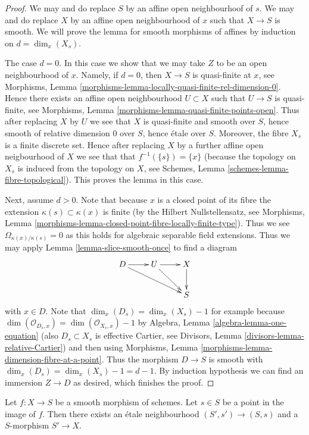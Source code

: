 \begin{proof}
We may and do replace $S$ by an affine open neighbourhoof of $s$.
We may and do replace $X$ by an affine open neighbourhood of $x$
such that $X \to S$ is smooth.
We will prove the lemma for smooth morphisms of affines
by induction on $d = \dim_x(X_s)$.

\medskip\noindent
The case $d = 0$. In this case we show that we may take $Z$ to be
an open neighbourhood of $x$. Namely, if $d = 0$, then $X \to S$
is quasi-finite at $x$, see
Morphisms, Lemma \ref{morphisms-lemma-locally-quasi-finite-rel-dimension-0}.
Hence there exists an affine open neighbourhood $U \subset X$ such
that $U \to S$ is quasi-finite, see
Morphisms, Lemma \ref{morphisms-lemma-quasi-finite-points-open}.
Thus after replacing $X$ by $U$ we see that
$X$ is quasi-finite and smooth over $S$, hence
smooth of relative dimension $0$ over $S$, hence
\'etale over $S$. Moreover, the fibre $X_s$ is a finite
discrete set. Hence after replacing $X$ by a further affine open neigbourhood
of $X$ we see that that $f^{-1}(\{s\}) = \{x\}$ (because the topology
on $X_s$ is induced from the topology on $X$, see
Schemes, Lemma \ref{schemes-lemma-fibre-topological}).
This proves the lemma in this case.

\medskip\noindent
Next, assume $d > 0$. Note that because $x$ is a closed point of its
fibre the extension $\kappa(s) \subset \kappa(x)$ is finite (by the
Hilbert Nullstellensatz, see
Morphisms, Lemma \ref{morphisms-lemma-closed-point-fibre-locally-finite-type}).
Thus we see $\Omega_{\kappa(x)/\kappa(s)} = 0$ as this holds for
algebraic separable field extensions.
Thus we may apply
Lemma \ref{lemma-slice-smooth-once}
to find a diagram
$$
\xymatrix{
D \ar[r] \ar[rrd] & U \ar[r] \ar[rd] & X \ar[d] \\
& & S
}
$$
with $x \in D$. Note that
$\dim_x(D_s) = \dim_x(X_s) - 1$ for example because
$\dim(\mathcal{O}_{D_s, x}) = \dim(\mathcal{O}_{X_s, x}) - 1$ by
Algebra, Lemma \ref{algebra-lemma-one-equation}
(also $D_s \subset X_s$ is effective Cartier, see
Divisors, Lemma \ref{divisors-lemma-relative-Cartier})
and then using
Morphisms, Lemma \ref{morphisms-lemma-dimension-fibre-at-a-point}.
Thus the morphism $D \to S$ is smooth with
$\dim_x(D_s) = \dim_x(X_s) - 1 = d - 1$. By induction hypothesis
we can find an immersion $Z \to D$ as desired, which finishes the proof.
\end{proof}

\begin{lemma}
\label{lemma-etale-nbhd-dominates-smooth}
Let $f : X \to S$ be a smooth morphism of schemes.
Let $s \in S$ be a point in the image of $f$.
Then there exists an \'etale neighbourhood $(S', s') \to (S, s)$
and a $S$-morphism $S' \to X$.
\end{lemma}

